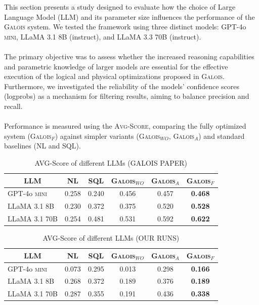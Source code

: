 This section presents a study designed to evaluate how the choice of Large Language Model (LLM) and its parameter size influences the performance of the \textsc{Galois} system. We tested the framework using three distinct models: GPT-4o \textsc{mini}, LLaMA 3.1 8B (instruct), and LLaMA 3.3 70B (instruct). 
\\\\
The primary objective was to assess whether the increased reasoning capabilities and parametric knowledge of larger models are essential for the effective execution of the logical and physical optimizations proposed in \textsc{Galois}. Furthermore, we investigated the reliability of the models' confidence scores (logprobs) as a mechanism for filtering results, aiming to balance precision and recall. 
\\\\
Performance is measured using the \textsc{Avg-Score}, comparing the fully optimized system (\textsc{Galois}$_{F}$) against simpler variants (\textsc{Galois}$_{WO}$, \textsc{Galois}$_{A}$) and standard baselines (NL and SQL).

\begin{table}[H]
    \centering
    \caption{AVG-Score of different LLMs (GALOIS PAPER)}
    \begin{tabular}{lccccc}
        \toprule
        \multicolumn{1}{c}{LLM} & NL & SQL & \textsc{Galois}$_{WO}$ & \textsc{Galois}$_{A}$ & \textsc{Galois}$_{F}$ \\
        \midrule
        GPT-4o \textsc{mini} & 0.258 & 0.240 & 0.456 & 0.457 & \textbf{0.468} \\
        LLaMA 3.1 8B         & 0.230 & 0.372 & 0.375 & 0.520 & \textbf{0.528} \\
        LLaMA 3.1 70B        & 0.254 & 0.481 & 0.531 & 0.592 & \textbf{0.622} \\
        \bottomrule
    \end{tabular}
\end{table}

\begin{table}[H]
    \centering
    \caption{AVG-Score of different LLMs (OUR RUNS)}
    \begin{tabular}{lccccc}
        \toprule
        \multicolumn{1}{c}{LLM} & NL & SQL & \textsc{Galois}$_{WO}$ & \textsc{Galois}$_{A}$ & \textsc{Galois}$_{F}$ \\
        \midrule
        GPT-4o \textsc{mini} & 0.073 & 0.295 & 0.013 & 0.298 & \textbf{0.166} \\
        LLaMA 3.1 8B         & 0.268 & 0.372 & 0.189 & 0.376 & \textbf{0.189} \\
        LLaMA 3.1 70B        & 0.287 & 0.355 & 0.191 & 0.436 & \textbf{0.338} \\
        \bottomrule
    \end{tabular}
\end{table}

